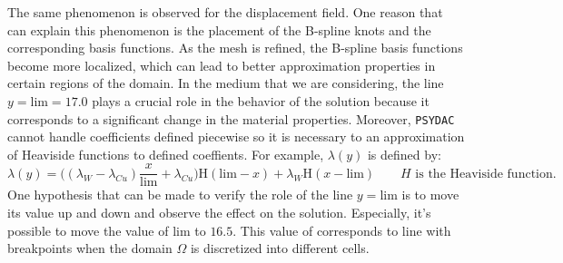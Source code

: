 \documentclass[a4paper,12pt,twoside]{report}
\begin{document}
The same phenomenon is observed for the displacement field.
One reason that can explain this phenomenon is the placement of the B-spline knots and the corresponding basis functions. As the mesh is refined, the B-spline basis functions become more localized, which can lead to better approximation properties in certain regions of the domain. In the medium that we are considering, the line $y = \text{lim} = 17.0$ plays a crucial role in the behavior of the solution because it corresponds to a significant change in the material properties. Moreover, \texttt{PSYDAC} cannot handle coefficients defined piecewise so it is necessary to an approximation of Heaviside functions to defined coeffients. For example, $\lambda(y)$ is defined by:
$$ \lambda(y) = \big( (\lambda_W - \lambda_{Cu}) \frac{x}{\text{lim}} + \lambda_{Cu} \big) \text{H}(\text{lim}-x) + \lambda_{W} \text{H}(x-\text{lim}) \qquad H \text{ is the Heaviside function}.$$
One hypothesis that can be made to verify the role of the line $y = \text{lim}$ is to move its value up and down and observe the effect on the solution. Especially, it's possible to move the value of $\text{lim}$ to $16.5$. This value of corresponds to line with breakpoints when the domain $\Omega$ is discretized into different cells. 
\end{document}

